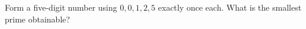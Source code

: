 Form a five-digit number using $0,0,1,2,5$ exactly once each. What is the smallest prime obtainable?

